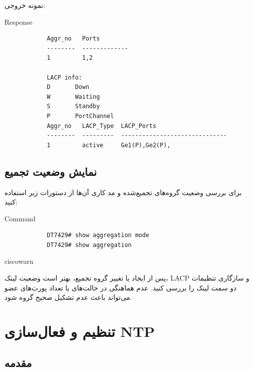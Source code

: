 \documentclass[11pt,letterpaper]{report}
\newenvironment{tipbox}[1]{%
	\begin{noticebox}[title={\textbf{\faLightbulb\ #1}}]{ciscowarn}
	}{%
	\end{noticebox}
}
\begin{document}
	نمونه خروجی:

	\begin{latin}
		\begin{cliexample}{Response}
			\begin{verbatim}
			Aggr_no   Ports
			--------  -------------
			1         1,2

			LACP info:
			D       Down
			W       Waiting
			S       Standby
			P       PortChannel
			Aggr_no   LACP_Type  LACP_Ports
			--------  ---------  ------------------------------
			1         active     Ge1(P),Ge2(P),
			\end{verbatim}
		\end{cliexample}
	\end{latin}


	\section{نمایش وضعیت تجمیع}

	برای بررسی وضعیت گروه‌های تجمیع‌شده و مد کاری آن‌ها از دستورات
	زیر استفاده کنید:

	\begin{latin}
		\begin{cliexample}{Command}
			\begin{verbatim}
			DT7429# show aggregation mode
			DT7429# show aggregation
			\end{verbatim}
		\end{cliexample}
	\end{latin}

	\begin{tipbox}{نکته مدیریتی}
		پس از ایجاد یا تغییر گروه تجمیع، بهتر است وضعیت لینک، LACP و
		سازگاری تنظیمات دو سمت لینک را بررسی کنید. عدم هماهنگی در
		حالت‌های  یا تعداد پورت‌های عضو می‌تواند باعث
		عدم تشکیل صحیح گروه شود.
	\end{tipbox}


	\chapter{تنظیم و فعال‌سازی NTP}

	\section{مقدمه}
\end{document}
